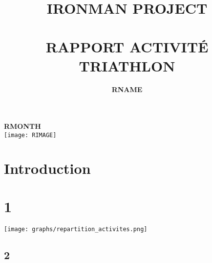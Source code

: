 \documentclass[a4paper,french,11pt]{report}
\title{	\normalsize \textsc{\uppercase{ironman project}}
		 	\\[1.2cm]
			\HRule{0.7pt} \\
			\vspace{0.5cm}
			\LARGE \textbf{\uppercase{rapport activité triathlon}}	%
			\HRule{1pt} \\
			\vspace{1.7cm}
		}
\author{
		\textbf{RNAME}\\
}
\makeatletter
\def\printtitle{%
    {\centering \@title\par}}
\def\printauthor{%
    {\centering \large \@author}}
\makeatother
\begin{document}

\thispagestyle{empty}		%

\printtitle					%
\printauthor				%
\vspace{1cm}

\begin{center}

\LARGE{\textbf{RMONTH}}\\
\vspace{4cm}
\texttt{[image: RIMAGE]}\\

\end{center}

\newpage




\chapter*{Introduction}


\chapter{1}
\texttt{[image: graphs/repartition\_activites.png]}
\section{2}

\end{document}
